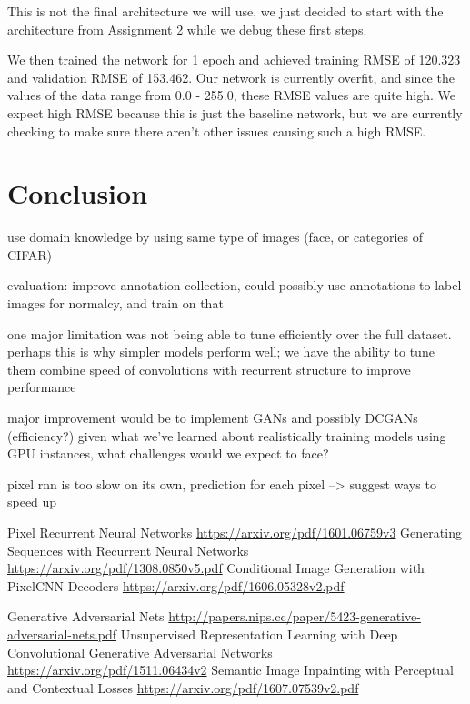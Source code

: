 \documentclass[10pt,twocolumn,letterpaper]{article}
\begin{document}
This is not the final architecture we will use, we just decided to start with the architecture from Assignment 2 while we debug these first steps. 

We then trained the network for 1 epoch and achieved training RMSE of 120.323 and validation RMSE of 153.462. Our network is currently overfit, and since the values of the data range from 0.0 - 255.0, these RMSE values are quite high. We expect high RMSE because this is just the baseline network, but we are currently checking to make sure there aren't other issues causing such a high RMSE.

\section{Conclusion}



use domain knowledge by using same type of images (face, or categories of CIFAR)

evaluation: 
improve annotation collection, could possibly use annotations to label images for normalcy, and train on that

one major limitation was not being able to tune efficiently over the full dataset. 
perhaps this is why simpler models perform well; we have the ability to tune them
combine speed of convolutions with recurrent structure to improve performance

major improvement would be to implement GANs and possibly DCGANs (efficiency?) given what we've learned about realistically training models using GPU instances, what challenges would we expect to face?



pixel rnn is too slow on its own, prediction for each pixel --> suggest ways to speed up


\begin{thebibliography}{1}
 Pixel Recurrent Neural Networks \url{https://arxiv.org/pdf/1601.06759v3}
 Generating Sequences with Recurrent Neural Networks \url{https://arxiv.org/pdf/1308.0850v5.pdf}
 Conditional Image Generation with PixelCNN Decoders \url{https://arxiv.org/pdf/1606.05328v2.pdf}

 Generative Adversarial Nets \url{http://papers.nips.cc/paper/5423-generative-adversarial-nets.pdf}
 Unsupervised Representation Learning with Deep Convolutional Generative Adversarial Networks \url{https://arxiv.org/pdf/1511.06434v2}
 Semantic Image Inpainting with Perceptual and Contextual Losses \url{https://arxiv.org/pdf/1607.07539v2.pdf}
\end{thebibliography}
\end{document}
